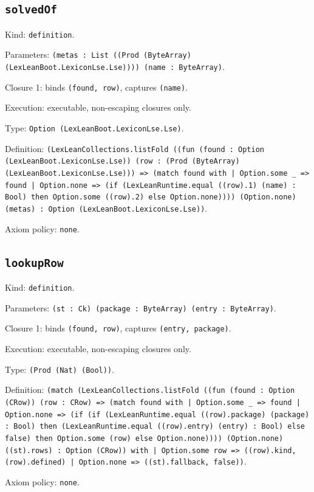 \documentclass[11pt]{article}
\begin{document}
\subsection*{\texttt{solvedOf}}
\noindent Kind: \texttt{definition}.\par
\noindent Parameters: \texttt{(metas : List ((Prod (ByteArray) (LexLeanBoot.LexiconLse.Lse)))) (name : ByteArray)}.\par
\noindent Closure 1: binds \texttt{(found, row)}, captures \texttt{(name)}.\par
\noindent Execution: executable, non-escaping closures only.\par
\noindent Type: \texttt{Option (LexLeanBoot.LexiconLse.Lse)}.\par
\noindent Definition: \texttt{(LexLeanCollections.listFold ((fun (found : Option (LexLeanBoot.LexiconLse.Lse)) (row : (Prod (ByteArray) (LexLeanBoot.LexiconLse.Lse))) => (match found with | Option.some \_ => found | Option.none => (if (LexLeanRuntime.equal ((row).1) (name) : Bool) then Option.some ((row).2) else Option.none)))) (Option.none) (metas) : Option (LexLeanBoot.LexiconLse.Lse))}.\par
\noindent Axiom policy: \texttt{none}.\par
\subsection*{\texttt{lookupRow}}
\noindent Kind: \texttt{definition}.\par
\noindent Parameters: \texttt{(st : Ck) (package : ByteArray) (entry : ByteArray)}.\par
\noindent Closure 1: binds \texttt{(found, row)}, captures \texttt{(entry, package)}.\par
\noindent Execution: executable, non-escaping closures only.\par
\noindent Type: \texttt{(Prod (Nat) (Bool))}.\par
\noindent Definition: \texttt{(match (LexLeanCollections.listFold ((fun (found : Option (CRow)) (row : CRow) => (match found with | Option.some \_ => found | Option.none => (if (if (LexLeanRuntime.equal ((row).package) (package) : Bool) then (LexLeanRuntime.equal ((row).entry) (entry) : Bool) else false) then Option.some (row) else Option.none)))) (Option.none) ((st).rows) : Option (CRow)) with | Option.some row => ((row).kind, (row).defined) | Option.none => ((st).fallback, false))}.\par
\noindent Axiom policy: \texttt{none}.\par
\end{document}
